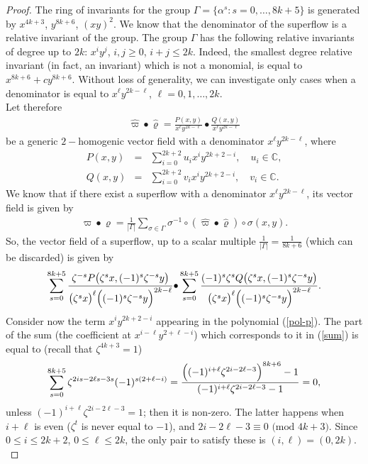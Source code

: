 \documentclass[reqno,12pt]{amsart}
\begin{document}
\begin{proof}The ring of invariants for the group $\Gamma=\{\alpha^{s}:s=0,\ldots,8k+5\}$ is generated by $x^{4k+3}$, $y^{8k+6}$, $(xy)^2$. We know that the denominator of the superflow is a relative invariant of the group. The group $\Gamma$ has the following relative invariants of degree up to $2k$: $x^{i}y^{j}$, $i,j\geq 0$, $i+j\leq 2k$. Indeed, the smallest degree relative invariant (in fact, an invariant) which is not a monomial, is equal to $x^{8k+6}+cy^{8k+6}$. Without loss of generality, we can investigate only cases when a denominator is equal to $x^{\ell}y^{2k-\ell}$, $\ell=0,1,\ldots,2k$. \\

Let therefore
\begin{eqnarray*}
\widehat{\varpi}{\bullet}\widehat{\varrho}=\frac{P(x,y)}{x^{\ell}y^{2k-\ell}}{\bullet}\frac{Q(x,y)}{x^{\ell}y^{2k-\ell}}
\end{eqnarray*} 
be a generic $2-$homogenic vector field with a denominator $x^{\ell}y^{2k-\ell}$, where
\begin{eqnarray}
P(x,y)&=&\sum\limits_{i=0}^{2k+2}u_{i}x^{i}y^{2k+2-i},\quad u_{i}\in\mathbb{C},\label{pol-p}\\
Q(x,y)&=&\sum\limits_{i=0}^{2k+2}v_{i}x^{i}y^{2k+2-i},\quad v_{i}\in\mathbb{C}\label{pol-q}.  
\end{eqnarray}  
We know that if there exist a superflow with a denominator $x^{\ell}y^{2k-\ell}$, its vector field is given by \cite{alkauskas-super1}
\begin{eqnarray*}
\varpi{\bullet}\varrho=\frac{1}{|\Gamma|}\sum\limits_{\sigma\in\Gamma}\sigma^{-1}
\circ(\widehat{\varpi}{\bullet}\widehat{\varrho})\circ{\sigma}(x,y).
\end{eqnarray*}
So, the vector field of a superflow, up to a scalar multiple $\frac{1}{|\Gamma|}=\frac{1}{8k+6}$ (which can be discarded) is given by
\begin{eqnarray}
\sum\limits_{s=0}^{8k+5}\frac{\zeta^{-s}P\big{(}\zeta^{s}x,(-1)^s\zeta^{-s}y\big{)}}{\big{(}\zeta^{s}x\big{)}^{\ell}\Big{(}(-1)^{s}\zeta^{-s}y\Big{)}^{2k-\ell}}{\bullet} \sum\limits_{s=0}^{8k+5}\frac{(-1)^{s}\zeta^{s}Q\big{(}\zeta^{s}x,(-1)^s\zeta^{-s}y\big{)}}{\big{(}\zeta^{s}x\big{)}^{\ell}\Big{(}(-1)^{s}\zeta^{-s}y\Big{)}^{2k-\ell}}.
\label{sum}
\end{eqnarray}
Consider now the term $x^{i}y^{2k+2-i}$ appearing in the polynomial (\ref{pol-p}). The part of the sum (the coefficient at $x^{i-\ell}y^{2+\ell-i}$) which corresponds to it in (\ref{sum}) is equal to (recall that $\zeta^{4k+3}=1$)
\begin{eqnarray}
\sum\limits_{s=0}^{8k+5}\zeta^{2is-2\ell s-3s}(-1)^{s(2+\ell-i)}
=
\frac{\Big{(}(-1)^{i+\ell}\zeta^{2i-2\ell-3}\Big{)}^{8k+6}-1}{(-1)^{i+\ell}\zeta^{2i-2\ell-3}-1}=0,
\label{sum-pirm}
\end{eqnarray}
unless $(-1)^{i+\ell}\zeta^{2i-2\ell-3}=1$; then it is non-zero. The latter happens when $i+\ell$ is even ($\zeta^{t}$ is never equal to $-1$), and $2i-2\ell-3\equiv 0\text{ (mod }4k+3)$. Since $0\leq i\leq 2k+2$, $0\leq\ell\leq 2k$, the only pair to satisfy these is $(i,\ell)=(0,2k)$. \\


\end{proof}
\end{document}
